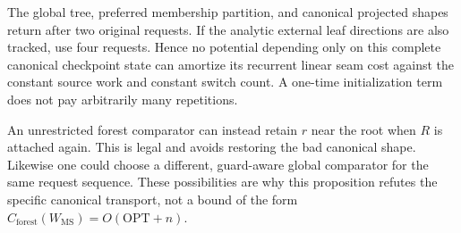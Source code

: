 \documentclass[11pt]{article}
\begin{document}
The global tree, preferred membership partition, and canonical
projected shapes return after two original requests. If the analytic
external leaf directions are also tracked, use four requests. Hence
no potential depending only on this complete canonical checkpoint
state can amortize its recurrent linear seam cost against the constant
source work and constant switch count. A one-time initialization term
does not pay arbitrarily many repetitions.

An unrestricted forest comparator can instead retain $r$ near the root
when $R$ is attached again. This is legal and avoids restoring the bad
canonical shape. Likewise one could choose a different, guard-aware
global comparator for the same request sequence. These possibilities
are why this proposition refutes the specific canonical transport,
not a bound of the form
$C_{\mathrm{forest}}(W_{\mathrm{MS}})=O(\mathrm{OPT}+n)$.
\end{document}
